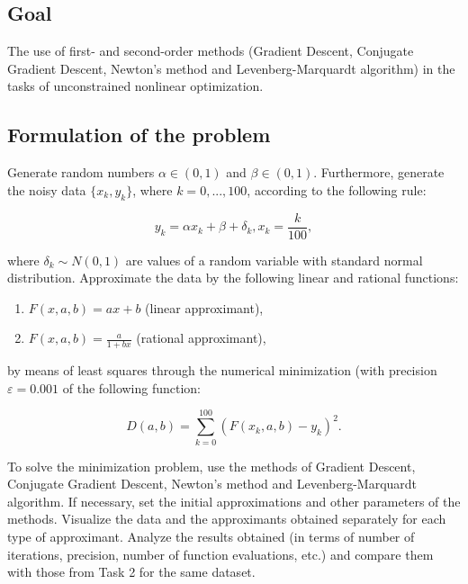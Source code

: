 \newpage
\subsection{Goal}\label{subsec:goal}

The use of first- and second-order methods (Gradient Descent, Conjugate Gradient Descent, Newton's method and Levenberg-Marquardt algorithm) in the tasks of unconstrained nonlinear optimization.

\subsection{Formulation of the problem}\label{subsec:formulation-of-the-problem}

Generate random numbers $\alpha \in (0, 1)$ and $\beta \in (0, 1)$.
Furthermore, generate the noisy data $\{x_k, y_k\}$, where $k = 0, ..., 100$, according to the following rule:

\begin{equation}
    y_k = \alpha x_k + \beta + \delta_k, x_k = \frac{k}{100},
\end{equation}

where $\delta_k \sim N(0, 1)$ are values of a random variable with standard normal distribution.
Approximate the data by the following linear and rational functions:

\begin{enumerate}
    \item $F(x, a, b) = ax + b$ (linear approximant),
    \item $F(x, a, b) = \frac{a}{1 + bx}$ (rational approximant),
\end{enumerate}

by means of least squares through the numerical minimization (with precision $\varepsilon = 0.001$ of the following function:

\begin{equation}
    D(a, b) = \sum^{100}_{k=0}(F(x_k, a, b) - y_k)^2.
\end{equation}

To solve the minimization problem, use the methods of Gradient Descent, Conjugate Gradient Descent, Newton's method and Levenberg-Marquardt algorithm.
If necessary, set the initial approximations and other parameters of the methods.
Visualize the data and the approximants obtained separately for each type of approximant.
Analyze the results obtained (in terms of number of iterations, precision, number of function evaluations, etc.) and compare them with those from Task 2 for the same dataset.

